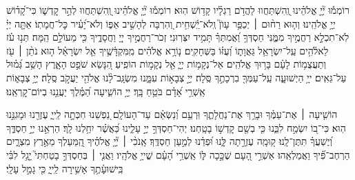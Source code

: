 \documentclass[twoside, openany, parskip=half, 11pt]{book}
\begin{document}
\newcommand{\negline}{\vspace{-\baselineskip}}

\negline

%
רוֹמְמ֡וּ יְ֘יָ֤ אֱלֹהֵ֗ינוּ וְֽ֭הִשְׁתַּחֲווּ לַהֲדֹ֥ם רַגְלָ֗יו קָד֥וֹשׁ הֽוּא׃
רוֹמְמ֡וּ יְ֘יָ֤ אֱלֹהֵ֗ינוּ וְֽ֭הִשְׁתַּחֲווּ לְהַ֣ר קׇדְשׁ֑וֹ כִּי־קָ֝ד֗וֹשׁ יְיָ֥ אֱלֹהֵֽינוּ׃
%
וְה֤וּא רַח֨וּם ׀ יְכַפֵּ֥ר עָוֺן֮ וְֽלֹא־יַֽ֫שְׁחִ֥ית וְ֭הִרְבָּה לְהָשִׁ֣יב אַפּ֑וֹ
וְלֹא־יָ֝עִ֗יר כׇּל־חֲמָתֽוֹ׃
%
אַתָּ֤ה יְיָ֗ לֹֽא־תִכְלָ֣א רַחֲמֶ֣יךָ מִמֶּ֑נִּי חַסְדְּךָ֥ וַ֝אֲמִתְּךָ֗ תָּמִ֥יד יִצְּרֽוּנִי׃
זְכֹר־רַחֲמֶ֣יךָ יְיָ֭ וַחֲסָדֶ֑יךָ כִּ֖י מֵעוֹלָ֣ם הֵֽמָּה׃
תְּנ֥וּ עֹ֗ז לֵאלֹ֫הִ֥ים עַֽל־יִשְׂרָאֵ֥ל גַּאֲוָת֑וֹ וְ֝עֻזּ֗וֹ בַּשְּׁחָקִֽים׃
נ֤וֹרָ֥א אֱלֹהִ֗ים מִֽמִּקְדָּ֫שֶׁ֥יךָ אֵ֤ל יִשְׂרָאֵ֗ל
ה֤וּא נֹתֵ֨ן ׀ עֹ֖ז וְתַעֲצֻמ֥וֹת לָעָ֗ם בָּר֥וּךְ אֱלֹהִֽים׃
אֵל־נְקָמ֥וֹת יְיָ֑ אֵ֖ל נְקָמ֣וֹת הוֹפִֽיעַ׃
הִ֭נָּשֵׂא שֹׁפֵ֣ט הָאָ֑רֶץ הָשֵׁ֥ב גְּ֝מ֗וּל עַל־גֵּאִֽים׃
ייָ֥ הַיְשׁוּעָ֑ה עַֽל־עַמְּךָ֖ בִרְכָתֶ֣ךָ סֶּֽלָה׃
 יְיָ֣ צְבָא֣וֹת עִמָּ֑נוּ מִשְׂגָּֽב־לָ֨נוּ אֱלֹהֵ֖י יַעֲקֹ֣ב סֶֽלָה׃
 יְיָ֥ צְבָא֑וֹת אַֽשְׁרֵ֥י אָ֝דָ֗ם בֹּטֵ֥חַ בָּֽךְ׃
 יְיָ֥ הוֹשִׁ֑יעָה הַ֝מֶּ֗לֶךְ יַעֲנֵ֥נוּ בְיוֹם־קׇרְאֵֽנוּ׃

הוֹשִׁ֤יעָה ׀ אֶת־עַמֶּ֗ךָ וּבָרֵ֥ךְ אֶת־נַחֲלָתֶ֑ךָ וּֽרְעֵ֥ם וְ֝נַשְּׂאֵ֗ם עַד־הָעוֹלָֽם׃
נַ֭פְשֵׁנוּ חִכְּתָ֣ה לַֽייָ֑ עֶזְרֵ֖נוּ וּמָגִנֵּ֣נוּ הֽוּא׃
כִּי־ב֭וֹ יִשְׂמַ֣ח לִבֵּ֑נוּ כִּ֤י בְשֵׁ֖ם קׇדְשׁ֣וֹ בָטָֽחְנוּ׃
יְהִי־חַסְדְּךָ֣ יְיָ֣ עָלֵ֑ינוּ כַּ֝אֲשֶׁ֗ר יִחַ֥לְנוּ לָֽךְ׃
הַרְאֵ֣נוּ יְיָ֣ חַסְדֶּ֑ךָ וְ֝יֶשְׁעֲךָ֗ תִּתֶּן־לָֽנוּ׃
ק֭וּמָֽה עֶזְרָ֣תָה לָּ֑נוּ וּ֝פְדֵ֗נוּ לְמַ֣עַן חַסְדֶּֽךָ׃
אָֽנֹכִ֨י ׀ יְ֘יָ֤ אֱלֹהֶ֗יךָ הַֽ֭מַּעַלְךָ מֵאֶ֣רֶץ מִצְרָ֑יִם הַרְחֶב־פִּ֗֝יךָ וַאֲמַלְאֵֽהוּ׃
אַשְׁרֵ֣י הָ֭עָם שֶׁכָּ֣כָה לּ֑וֹ אַֽשְׁרֵ֥י הָ֝עָ֗ם שֱׁייָ֥ אֱלֹהָֽיו׃
וַאֲנִ֤י ׀ בְּחַסְדְּךָ֣ בָטַחְתִּי֮ יָ֤גֵ֥ל לִבִּ֗י בִּֽישׁוּעָ֫תֶ֥ךָ אָשִׁ֥ירָה לַֽייָ֑ כִּ֖י גָמַ֣ל עָלָֽי׃

\negline
\end{document}
